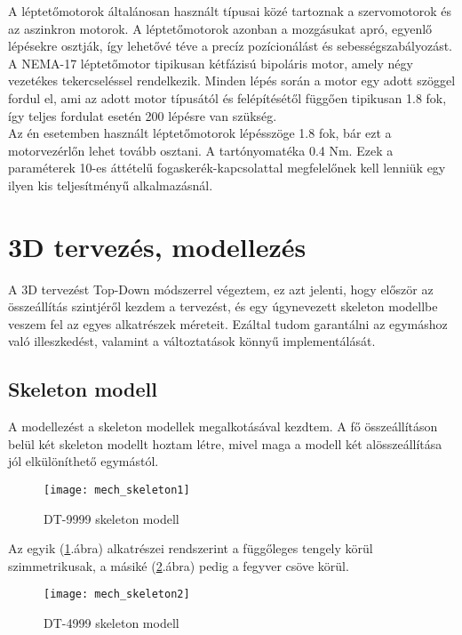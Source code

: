 A léptetőmotorok általánosan használt típusai közé tartoznak a szervomotorok és az aszinkron motorok. A léptetőmotorok azonban a mozgásukat apró, egyenlő lépésekre osztják, így lehetővé téve a precíz pozícionálást és sebességszabályozást. A NEMA-17 léptetőmotor tipikusan kétfázisú bipoláris motor, amely négy vezetékes tekercseléssel rendelkezik. Minden lépés során a motor egy adott szöggel fordul el, ami az adott motor típusától és felépítésétől függően tipikusan 1.8 fok, így teljes fordulat esetén 200 lépésre van szükség.\\

Az én esetemben használt léptetőmotorok lépésszöge 1.8 fok, bár ezt a motorvezérlőn lehet tovább osztani. A tartónyomatéka 0.4 Nm. Ezek a paraméterek 10-es áttételű fogaskerék-kapcsolattal megfelelőnek kell lenniük egy ilyen kis teljesítményű alkalmazásnál.

\pagebreak

\section{3D tervezés, modellezés}
A 3D tervezést Top-Down módszerrel végeztem, ez azt jelenti, hogy először az összeállítás szintjéről kezdem a tervezést, és egy úgynevezett skeleton modellbe veszem fel az egyes alkatrészek méreteit. Ezáltal tudom garantálni az egymáshoz való illeszkedést, valamint a változtatások könnyű implementálását.\\

\subsection{Skeleton modell}
A modellezést a skeleton modellek megalkotásával kezdtem. A fő összeállításon belül két skeleton modellt hoztam létre, mivel maga a modell két alösszeállítása jól elkülöníthető egymástól.

\begin{figure}[h!]
	\centering
	\texttt{[image: mech\_skeleton1]}
	\caption{DT-9999 skeleton modell}
	\label{fig:mech_skeleton1}
\end{figure}

Az egyik (\ref{fig:mech_skeleton1}.ábra) alkatrészei rendszerint a függőleges tengely körül szimmetrikusak, a másiké (\ref{fig:mech_skeleton2}.ábra) pedig a fegyver csöve körül.

\begin{figure}[h!]
	\centering
	\texttt{[image: mech\_skeleton2]}
	\caption{DT-4999 skeleton modell}
	\label{fig:mech_skeleton2}
\end{figure}

